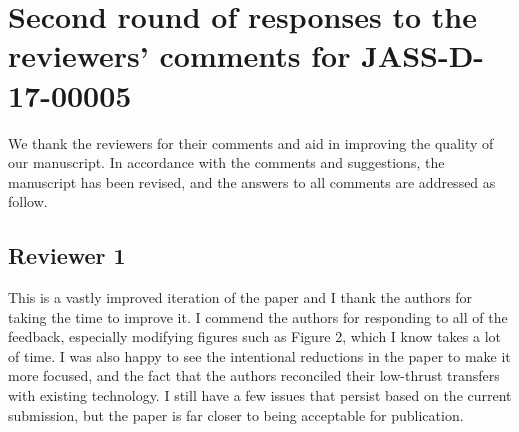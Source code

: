 \documentclass[11pt]{article}
\begin{document}

\section*{Second round of responses to the reviewers' comments for JASS-D-17-00005}

We thank the reviewers for their comments and aid in improving the quality of our manuscript. 
In accordance with the comments and suggestions, the manuscript has been revised, and the answers to all comments are addressed as follow.

\subsection*{Reviewer 1}
\begin{itshape}
This is a vastly improved iteration of the paper and I thank the authors for taking the time to improve it.  I commend the authors for responding to all of the feedback, especially modifying figures such as Figure 2, which I know takes a lot of time.  I was also happy to see the intentional reductions in the paper to make it more focused, and the fact that the authors reconciled their low-thrust transfers with existing technology.  I still have a few issues that persist based on the current submission, but the paper is far closer to being acceptable for publication.
\end{itshape}
\end{document}

